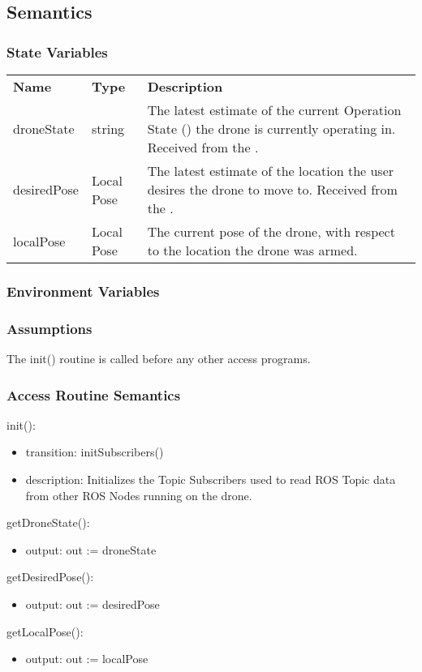 \documentclass[12pt, titlepage]{article}
\begin{document}
\subsection{Semantics}
\subsubsection{State Variables}
\begin{center}
\begin{tabular}{p{2.5 cm} p{2.5cm} p{8cm} }
\hline
\textbf{Name} & \textbf{Type} & \textbf{Description}  \\
droneState & string & The latest estimate of the current Operation State (\nameref{Operation States}) the drone is currently operating in. Received from the \nameref{Operations Manager}.  \\
desiredPose & Local Pose & The latest estimate of the location the user desires the drone to move to. Received from the \nameref{Operations Manager}. \\
localPose & Local Pose & The current pose of the drone, with respect to the location the drone was armed.  \\
\hline
\hline
\end{tabular}
\end{center}
\subsubsection{Environment Variables}
\subsubsection{Assumptions}
The init() routine is called before any other access programs.
\subsubsection{Access Routine Semantics}
\noindent init():
\begin{itemize}
\item transition: initSubscribers()
\item description: Initializes the Topic Subscribers used to read ROS Topic data from other ROS Nodes running on the drone.
\end{itemize}
\noindent getDroneState():
\begin{itemize}
\item output: out := droneState 
\end{itemize}
\noindent getDesiredPose():
\begin{itemize}
\item output: out := desiredPose 
\end{itemize}
\noindent getLocalPose():
\begin{itemize}
\item output: out := localPose 
\end{itemize}
\end{document}

